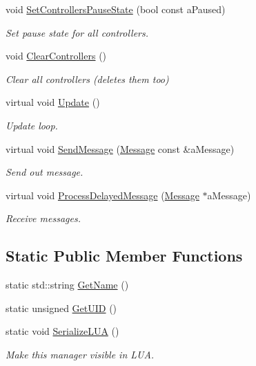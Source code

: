 \begin{DoxyCompactItemize}
void \hyperlink{classControllerManager_a776ad50ea2321e61156fe21975cc46c5}{Set\+Controllers\+Pause\+State} (bool const a\+Paused)
\begin{DoxyCompactList}\small\item\em Set pause state for all controllers. \end{DoxyCompactList}\item 
void \hyperlink{classControllerManager_ad5770469404986fb3146bd73fbbe2a56}{Clear\+Controllers} ()
\begin{DoxyCompactList}\small\item\em Clear all controllers (deletes them too) \end{DoxyCompactList}\item 
virtual void \hyperlink{classControllerManager_a8f59b1425c2dc17c1fd93875230f714c}{Update} ()
\begin{DoxyCompactList}\small\item\em Update loop. \end{DoxyCompactList}\item 
virtual void \hyperlink{classControllerManager_a51d581f556f5dc1df44dd9bf52bf654b}{Send\+Message} (\hyperlink{classMessage}{Message} const \&a\+Message)
\begin{DoxyCompactList}\small\item\em Send out message. \end{DoxyCompactList}\item 
virtual void \hyperlink{classControllerManager_a33a4e3b271d5d38304d3e22197d719dd}{Process\+Delayed\+Message} (\hyperlink{classMessage}{Message} $\ast$a\+Message)
\begin{DoxyCompactList}\small\item\em Receive messages. \end{DoxyCompactList}\end{DoxyCompactItemize}
\subsection*{Static Public Member Functions}
\begin{DoxyCompactItemize}
\item 
static std\+::string \hyperlink{classControllerManager_aef2fe02d5bee7cb33e91dbd3d0e79eb6}{Get\+Name} ()
\item 
static unsigned \hyperlink{classControllerManager_a5a580ca9cbe304828b1b126030cecb36}{Get\+U\+ID} ()
\item 
static void \hyperlink{classControllerManager_ab921691cf68923ded98c62ec39ad7807}{Serialize\+L\+UA} ()
\begin{DoxyCompactList}\small\item\em Make this manager visible in L\+UA. \end{DoxyCompactList}\end{DoxyCompactItemize}
